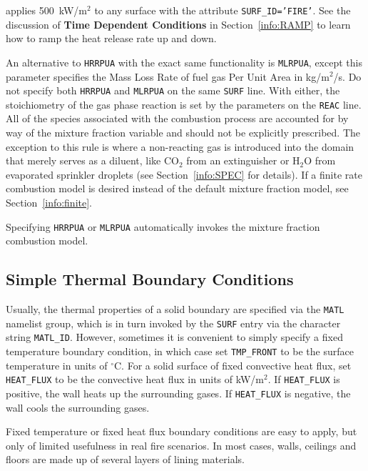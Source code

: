 \documentclass[11pt]{book}
\newcommand{\ct}{\tt\small}
\begin{document}
\noindent
applies 500~kW/m$^2$ to any surface with the attribute
{\ct SURF\_ID='FIRE'}. See the discussion of {\bf Time Dependent Conditions}
in Section~\ref{info:RAMP} to learn how to ramp the heat release rate up and down.

An alternative to {\ct HRRPUA} with the exact same functionality is
{\ct MLRPUA}, except this parameter 
specifies the Mass Loss Rate of fuel gas Per Unit Area in kg/m$^2$/s. Do not specify both
{\ct HRRPUA} and {\ct MLRPUA} on the same {\ct SURF} line. With either,
the stoichiometry of the gas phase reaction is set by the
parameters on the {\ct REAC} line. All of the
species associated with the combustion process are accounted for
by way of the mixture fraction variable and should not be
explicitly prescribed. The exception to this rule is
where a non-reacting gas is introduced into the domain that merely serves
as a diluent, like CO$_2$ from an extinguisher or H$_2$O from evaporated
sprinkler droplets (see Section~\ref{info:SPEC} for details).
If a finite rate combustion model is desired instead of the default mixture
fraction model, see Section~\ref{info:finite}.

\begin{warning}
Specifying {\ct HRRPUA} or {\ct MLRPUA} automatically invokes the mixture fraction
combustion model.
\end{warning}



\subsection{Simple Thermal Boundary Conditions}
\label{info:thermalboundary} 

Usually, the thermal properties of a solid boundary are specified via the
{\ct MATL} namelist group, which is in turn invoked by the {\ct SURF} entry via
the character string {\ct MATL\_ID}. However, sometimes it is convenient to
simply specify a fixed temperature boundary condition, in which case set
{\ct TMP\_FRONT} to be the surface temperature in units of $^\circ$C.
For a solid surface of fixed convective heat flux, set {\ct HEAT\_FLUX} to be
the convective heat flux in units of kW/m$^2$. If {\ct HEAT\_FLUX} is
positive, the wall heats up the surrounding gases. If {\ct HEAT\_FLUX}
is negative, the wall cools the surrounding gases.

Fixed temperature or fixed heat flux boundary conditions are
easy to apply, but only of limited usefulness in real fire scenarios.
In most cases, walls, ceilings and floors are made up of several layers
of lining materials.
\end{document}
